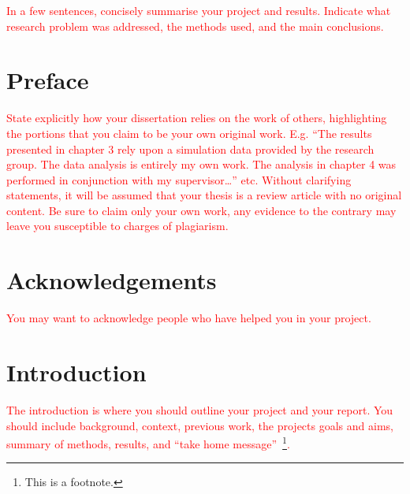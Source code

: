 \documentclass[aps,pra,a4paper,nofootinbib,preprint,12pt]{revtex4-1} %
\begin{document}
\textcolor{red}{In a few sentences, concisely summarise your project and results. Indicate what research problem was addressed, the methods used, and the main conclusions.} 

\newpage
\section*{Preface}

\textcolor{red}{State explicitly how your dissertation relies on the work of others, highlighting the portions that you claim to be your own original work. E.g. ``The results presented in chapter 3 rely upon a simulation data provided by the research group. The data analysis is entirely my own work. The analysis in chapter 4 was performed in conjunction with my supervisor\ldots'' etc.  Without clarifying statements, it will be assumed that your thesis is a review article with no original content. Be sure to claim only your own work, any evidence to the contrary may leave you susceptible to charges of plagiarism.}

\newpage
\section*{Acknowledgements}

\textcolor{red}{You may want to acknowledge people who have helped you in your project.}

\newpage
\tableofcontents %
\makeatletter
\let\toc@pre\relax
\let\toc@post\relax
\makeatother 

\newpage %
\listoffigures
{}

\newpage %
\listoftables
{}

\clearpage



\newpage
{}
\section{Introduction}

\textcolor{red}{The introduction is where you should outline your project and your report. You should include background, context, previous work, the projects goals and aims, summary of methods, results, and ``take home message''~\footnote{This is a footnote.}.}
\end{document}
